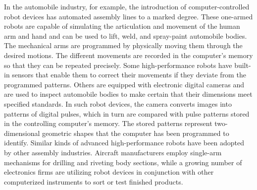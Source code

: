 \documentclass[a4paper]{article}
\begin{document}
In the automobile industry, for example, the
introduction of computer-controlled robot devices has automated assembly lines
to a marked degree. These one-armed robots are capable of simulating the
articulation and movement of the human arm and hand and can be used to lift,
weld, and spray-paint automobile bodies. The mechanical arms are programmed by
physically moving them through the desired motions. The different movements are
recorded in the computer's memory so that they can be repeated precisely. Some
high-performance robots have built-in sensors that enable them to correct their
movements if they deviate from the programmed patterns. Others are equipped with
electronic digital cameras and are used to inspect automobile bodies to make
certain that their dimensions meet specified standards. In such robot devices,
the camera converts images into patterns of digital pulses, which in turn are
compared with pulse patterns stored in the controlling computer's memory. The
stored patterns represent two-dimensional geometric shapes that the computer has
been programmed to identify. Similar kinds of advanced high-performance robots
have been adopted by other assembly industries. Aircraft manufacturers employ
single-arm mechanisms for drilling and riveting body sections, while a growing
number of electronics firms are utilizing robot devices in conjunction with
other computerized instruments to sort or test finished products.
\end{document}
